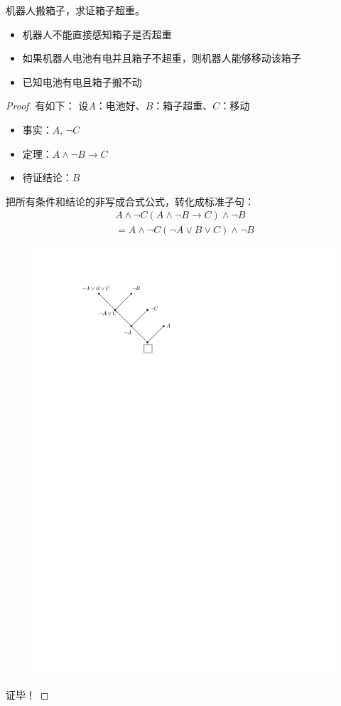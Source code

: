 \begin{example}
    机器人搬箱子，求证箱子超重。
    \begin{itemize}
        \item 机器人不能直接感知箱子是否超重
        \item 如果机器人电池有电并且箱子不超重，则机器人能够移动该箱子
        \item 已知电池有电且箱子搬不动
    \end{itemize}
    \begin{proof}
        有如下：
        设$A$：电池好、$B$：箱子超重、$C$：移动
        \begin{itemize}
            \item \textcolor{main1}{事实：}$A,\, \lnot C$
            \item \textcolor{main1}{定理：}$A\land \lnot B\to C$
            \item \textcolor{main1}{待证结论：}$B$
        \end{itemize}
        把\textcolor{main1}{所有条件和结论的非}写成合式公式，转化成标准子句：
        \[
            \begin{array}{l}
                A\land \lnot C\left( A\land \lnot B\to C \right)\land \lnot B\\
                =A\land \lnot C\left( \lnot A\lor B\lor C \right)\land \lnot B
            \end{array}
        \]        
        \begin{figure}[H]
            \centering
            \includegraphics[width = .35\textwidth]{image/机器人搬箱子.pdf}
        \end{figure}
        证毕！
    \end{proof}
\end{example}
